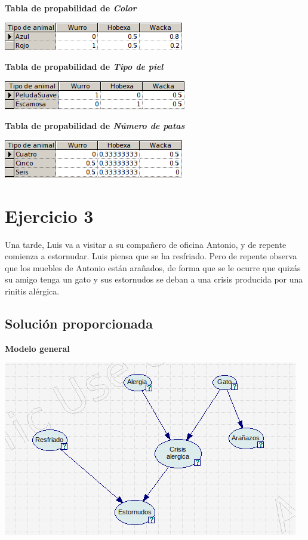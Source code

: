\documentclass{article}
\begin{document}
\textbf{Tabla de propabilidad de \textit{Color}}

\begin{center}
\includegraphics[scale=0.5]{Color.png}
\end{center}

\textbf{Tabla de propabilidad de \textit{Tipo de piel}}

\begin{center}
\includegraphics[scale=0.5]{piel.png}
\end{center}

\textbf{Tabla de propabilidad de \textit{Número de patas}}

\begin{center}
\includegraphics[scale=0.5]{Patas.png}
\end{center}

\section{Ejercicio 3}

Una tarde, Luis va a visitar a su compañero de oficina Antonio, y de repente comienza a
estornudar. Luis piensa que se ha resfriado. Pero de repente observa que los muebles de Antonio están arañados, de forma que se le ocurre que quizás su amigo tenga un gato y sus estornudos se deban a una crisis producida por una rinitis alérgica.

\newpage

\subsection{Solución proporcionada}

\textbf{Modelo general}

\begin{center}
\includegraphics[scale=0.5]{Modelo3.png}
\end{center}
\end{document}
